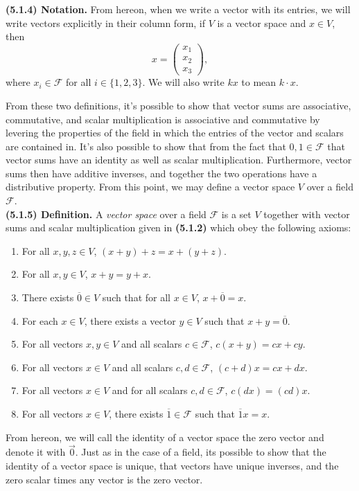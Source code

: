 \documentclass[12pt]{book}
\def\eq[#1]{{\overline{#1}}}
\def\cF{{\mathcal{F}}}
\begin{document}
\noindent\textbf{(5.1.4) Notation.} From hereon, when we write a vector with its entries, we will write vectors explicitly in their column form, if $V$ is a vector space and $x\in V$, then 
\[x=\begin{pmatrix}
x_1\\
x_2\\
x_3
\end{pmatrix},\]
where $x_i\in\cF$ for all $i\in\{1,2,3\}$. We will also write $kx$ to mean $k\cdot x$.

From these two definitions, it's possible to show that vector sums are associative, commutative, and scalar multiplication is associative and commutative by levering the properties of the field in which the entries of the vector and scalars are contained in. It's also possible to show that from the fact that $0,1\in\cF$ that vector sums have an identity as well as scalar multiplication. Furthermore, vector sums then have additive inverses, and together the two operations have a distributive property. From this point, we may define a vector space $V$ over a field $\cF$.\\


\noindent\textbf{(5.1.5) Definition.} A \textit{vector space} over a field $\cF$ is a set $V$ together with vector sums and scalar multiplication given in \textbf{(5.1.2)} which obey the following axioms:
\begin{enumerate}[label=\arabic*), itemsep=0.7mm]
\item For all $x,y,z\in V$, $(x+y)+z=x+(y+z)$.
\item For all $x,y\in V$, $x+y=y+x$.
\item There exists $\eq[0]\in V$ such that for all $x\in V$, $x+\eq[0]=x$.
\item For each $x\in V$, there exists a vector $y\in V$ such that $x+y=\eq[0]$.
\item For all vectors $x,y\in V$ and all scalars $c\in\cF$, $c(x+y)=cx+cy$.
\item For all vectors $x\in V$ and all scalars $c,d\in\cF$, $(c+d)x=cx+dx$.
\item For all vectors $x\in V$ and for all scalars $c,d\in\cF$, $c(dx)=(cd)x$.
\item For all vectors $x\in V$, there exists $\eq[1]\in\cF$ such that $\eq[1]x=x$.
\end{enumerate}

From hereon, we will call the identity of a vector space the zero vector and denote it with $\vec{0}$. Just as in the case of a field, its possible to show that the identity of a vector space is unique, that vectors have unique inverses, and the zero scalar times any vector is the zero vector.
\end{document}
